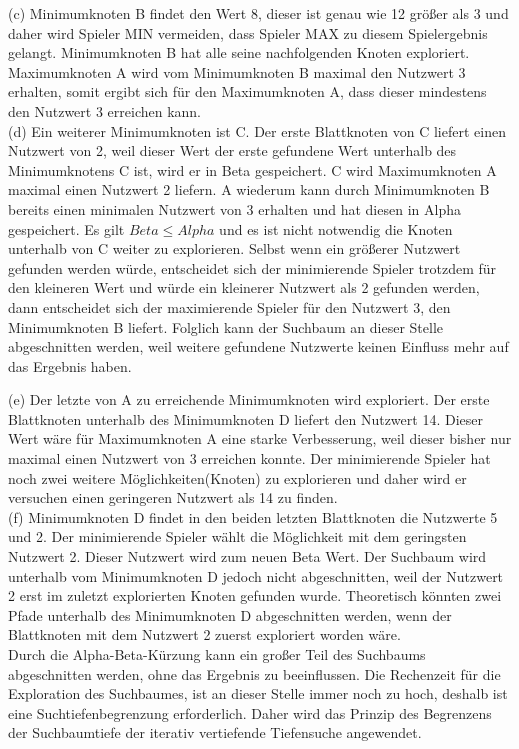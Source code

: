 (c) Minimumknoten B findet den Wert 8, dieser ist genau wie 12 größer als 3 und daher wird Spieler MIN vermeiden, dass Spieler MAX zu diesem Spielergebnis gelangt. Minimumknoten B hat alle seine nachfolgenden Knoten exploriert. Maximumknoten A wird vom Minimumknoten B maximal den Nutzwert 3 erhalten, somit ergibt sich für den Maximumknoten A, dass dieser mindestens den Nutzwert 3 erreichen kann. \\

(d) Ein weiterer Minimumknoten ist C. Der erste Blattknoten von C liefert einen Nutzwert von 2, weil dieser Wert der erste gefundene Wert unterhalb des Minimumknotens C ist, wird er in Beta gespeichert. C wird Maximumknoten A maximal einen Nutzwert 2 liefern. A wiederum kann durch Minimumknoten B bereits einen minimalen Nutzwert von 3 erhalten und hat diesen in Alpha gespeichert. Es gilt $Beta \leq Alpha$ und es ist nicht notwendig die Knoten unterhalb von C weiter zu explorieren. Selbst wenn ein größerer Nutzwert gefunden werden würde, entscheidet sich der minimierende Spieler trotzdem für den kleineren Wert und würde ein kleinerer Nutzwert als 2 gefunden werden, dann entscheidet sich der maximierende Spieler für den Nutzwert 3, den Minimumknoten B liefert. Folglich kann der Suchbaum an dieser Stelle abgeschnitten werden, weil weitere gefundene Nutzwerte keinen Einfluss mehr auf das Ergebnis haben. \\
\newpage

(e) Der letzte von A zu erreichende Minimumknoten wird exploriert. Der erste Blattknoten unterhalb des Minimumknoten D liefert den Nutzwert 14. Dieser Wert wäre für Maximumknoten A eine starke Verbesserung, weil dieser bisher nur maximal einen Nutzwert von 3 erreichen konnte. Der minimierende Spieler hat noch zwei weitere Möglichkeiten(Knoten) zu explorieren und daher wird er versuchen einen geringeren Nutzwert als 14 zu finden. \\

(f) Minimumknoten D findet in den beiden letzten Blattknoten die Nutzwerte 5 und 2. Der minimierende Spieler wählt die Möglichkeit mit dem geringsten Nutzwert 2. Dieser Nutzwert wird zum neuen Beta Wert. Der Suchbaum wird unterhalb vom Minimumknoten D jedoch nicht abgeschnitten, weil der Nutzwert 2 erst im zuletzt explorierten Knoten gefunden wurde. Theoretisch könnten zwei Pfade unterhalb des Minimumknoten D abgeschnitten werden, wenn der Blattknoten mit dem Nutzwert 2 zuerst exploriert worden wäre.\\

Durch die Alpha-Beta-Kürzung kann ein großer Teil des Suchbaums abgeschnitten werden, ohne das Ergebnis zu beeinflussen. Die Rechenzeit für die Exploration des Suchbaumes, ist an dieser Stelle immer noch zu hoch, deshalb ist eine Suchtiefenbegrenzung erforderlich. Daher wird das Prinzip des Begrenzens der Suchbaumtiefe der iterativ vertiefende Tiefensuche angewendet. \\

